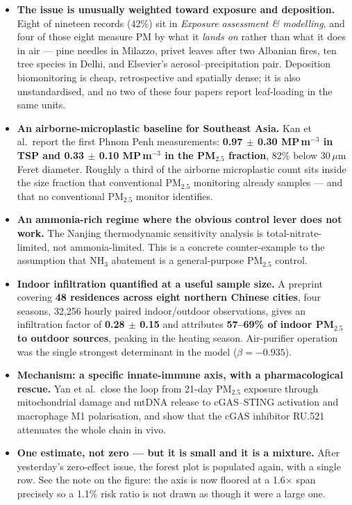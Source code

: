 \documentclass[10pt]{article}
\begin{document}
\footnotesize
\begin{itemize}
\item \textbf{The issue is unusually weighted toward exposure and deposition.} Eight of
nineteen records (42\%) sit in \textit{Exposure assessment \& modelling}, and four of
those eight measure PM by what it \emph{lands on} rather than what it does in air ---
pine needles in Milazzo, privet leaves after two Albanian fires, ten tree species in
Delhi, and Elsevier's aerosol--precipitation pair. Deposition biomonitoring is cheap,
retrospective and spatially dense; it is also unstandardised, and no two of these four
papers report leaf-loading in the same units.

\item \textbf{An airborne-microplastic baseline for Southeast Asia.} Kan et al.\ report
the first Phnom Penh measurements: \textbf{0.97 $\pm$ 0.30 MP\,m$^{-3}$ in TSP and
0.33 $\pm$ 0.10 MP\,m$^{-3}$ in the PM$_{2.5}$ fraction}, 82\% below 30\,$\mu$m Feret
diameter. Roughly a third of the airborne microplastic count sits inside the size
fraction that conventional PM$_{2.5}$ monitoring already samples --- and that no
conventional PM$_{2.5}$ monitor identifies.

\item \textbf{An ammonia-rich regime where the obvious control lever does not work.}
The Nanjing thermodynamic sensitivity analysis is total-nitrate-limited, not
ammonia-limited. This is a concrete counter-example to the assumption that NH$_3$
abatement is a general-purpose PM$_{2.5}$ control.

\item \textbf{Indoor infiltration quantified at a useful sample size.} A preprint
covering \textbf{48 residences across eight northern Chinese cities}, four seasons,
32{,}256 hourly paired indoor/outdoor observations, gives an infiltration factor of
\textbf{0.28 $\pm$ 0.15} and attributes \textbf{57--69\% of indoor PM$_{2.5}$ to outdoor
sources}, peaking in the heating season. Air-purifier operation was the single strongest
determinant in the model ($\beta = -0.935$).

\item \textbf{Mechanism: a specific innate-immune axis, with a pharmacological rescue.}
Yan et al.\ close the loop from 21-day PM$_{2.5}$ exposure through mitochondrial damage
and mtDNA release to cGAS--STING activation and macrophage M1 polarisation, and show
that the cGAS inhibitor RU.521 attenuates the whole chain in vivo.

\item \textbf{One estimate, not zero --- but it is small and it is a mixture.} After
yesterday's zero-effect issue, the forest plot is populated again, with a single row.
See the note on the figure: the axis is now floored at a 1.6$\times$ span precisely so a
1.1\% risk ratio is not drawn as though it were a large one.
\end{itemize}
\end{document}
